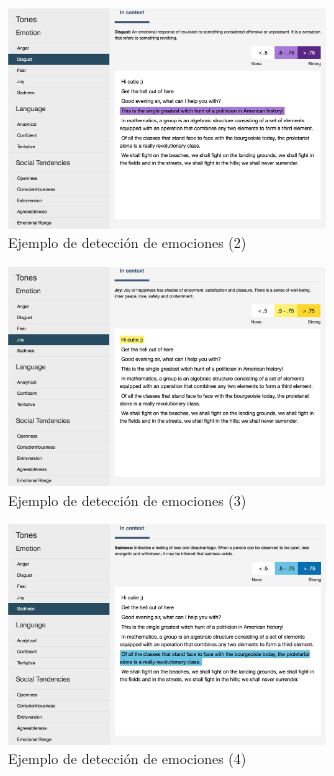 \documentclass[paper=a4, fontsize=10pt]{scrartcl} %
\numberwithin{equation}{section} %
\numberwithin{figure}{section} %
\numberwithin{table}{section} %
\begin{document}
\begin{figure}[H]
			\centering
			\label{disgust.jpg}
			\includegraphics[width=0.75\textwidth]{./Imagenes/disgust.jpeg}
			\caption{Ejemplo de detección de emociones (2)}
\end{figure}

\begin{figure}[H]
			\centering
			\label{joy.jpg}
			\includegraphics[width=0.75\textwidth]{./Imagenes/joy.jpeg}
			\caption{Ejemplo de detección de emociones (3)}
\end{figure}

\begin{figure}[H]
			\centering
			\label{sadness.jpg}
			\includegraphics[width=0.75\textwidth]{./Imagenes/sadness.jpeg}
			\caption{Ejemplo de detección de emociones (4)}
\end{figure}
\end{document}
